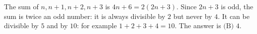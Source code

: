 The sum of $n,n+1,n+2,n+3$ is $4n+6=2(2n+3)$. Since $2n+3$ is odd, the sum is twice an odd number: it is always divisible by $2$ but never by $4$. It can be divisible by $5$ and by $10$: for example $1+2+3+4=10$. The answer is $\boxed{\text{(B) } 4}$.
